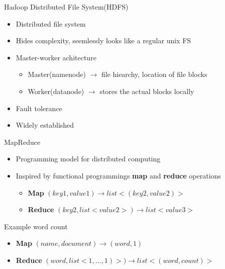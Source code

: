 \begin{frame}{Hadoop Distributed File System(HDFS)}
    \begin{itemize}
        \item Distributed file system 
        \item Hides complexity, seemlessly looks like a regular unix FS
        \item Master-worker achitecture
        \begin{itemize}
            \item Master(namenode) $\rightarrow$ file hiearchy, location of file blocks
            \item Worker(datanode) $\rightarrow$ stores the actual blocks locally
        \end{itemize}
        \item Fault tolerance
        \item Widely established
    \end{itemize}
\end{frame}


\begin{frame}{MapReduce}
    \begin{itemize}
        \item Programming model for distributed computing
        \item Inspired by functional programmings \textbf{map} and \textbf{reduce} operations
        \begin{itemize}
            \item \textbf{Map} $(key1, value1) \rightarrow list<(key2, value2)>$
            \item \textbf{Reduce} $(key2, list<value2>) \rightarrow list<value3>$
        \end{itemize}
    \end{itemize}
    Example word count
    \begin{itemize}
        \item \textbf{Map} $(name, document) \rightarrow (word, 1)$
        \item \textbf{Reduce} $(word, list<1,\dots,1)>) \rightarrow list<(word,count)>$
    \end{itemize}
\end{frame}

